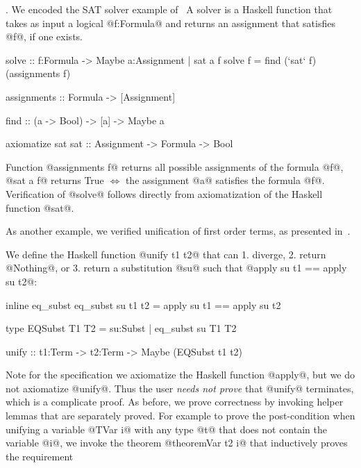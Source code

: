.
We encoded the SAT solver example of~\citep{Zombie}
A solver is a Haskell function that takes as input a logical
@f:Formula@ and returns an assignment that satisfies @f@,
if one exists.

\begin{code}
  solve :: f:Formula
        -> Maybe {a:Assignment | sat a f }
  solve f = find (`sat` f) (assignments f)

  assignments :: Formula -> [Assignment]

  find :: (a -> Bool) -> [a] -> Maybe a

  axiomatize sat
  sat :: Assignment -> Formula -> Bool
  \end{code}

Function @assignments f@ returns all possible assignments of the formula @f@,
@sat a f@ returns True $\iff$ the assignment @a@ satisfies the formula @f@.
%
Verification of @solve@ follows directly from axiomatization of the Haskell function @sat@.

As another example, we verified unification of first order terms,
as presented in~\citep{Sjoberg2015}.

We define the Haskell function @unify t1 t2@ that can
1. diverge, 2. return @Nothing@, or 3. return a substitution @su@ such that
@apply su t1 == apply su t2@:

\begin{code}
  inline eq_subst
  eq_subst su t1 t2
    = apply su t1 == apply su t2

  type EQSubst T1 T2 =
    {su:Subst | eq_subst su T1 T2 }

  unify :: t1:Term -> t2:Term
        -> Maybe (EQSubst t1 t2)
\end{code}
%
Note for the specification we axiomatize the Haskell function @apply@,
but we do not axiomatize @unify@.
Thus the user \textit{needs not prove} that @unify@ terminates, which is a complicate proof.
%
As before, we prove correctness by invoking helper lemmas that
are separately proved.
%
For example to prove the post-condition when unifying a variable
@TVar i@ with any type @t@ that does not contain the variable @i@,
we invoke the theorem @theoremVar t2 i@ that inductively proves the requirement


